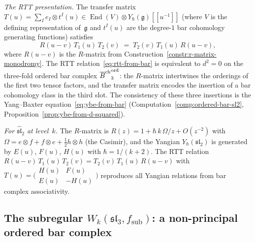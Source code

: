 \begin{construction}
\emph{The RTT presentation.}
The transfer matrix
$T(u)=\sum_I e_I\otimes t^I(u)
\in\operatorname{End}(V)\otimes Y_\hbar(\mathfrak g)[\![u^{-1}]\!]$
(where $V$ is the defining representation of~$\mathfrak g$
and $t^I(u)$ are the degree-$1$ bar cohomology generating
functions) satisfies
\begin{equation}%
R(u{-}v)\,T_1(u)\,T_2(v)
\;=\;
T_2(v)\,T_1(u)\,R(u{-}v),
\end{equation}
where $R(u-v)$ is the $R$-matrix from
Construction~\ref{constr:r-matrix-monodromy}. The RTT
relation~\eqref{eq:rtt-from-bar} is equivalent to $d^2=0$
on the three-fold ordered bar complex
${\overline{B}^{\mathrm{ch}}}_3^{\mathrm{ord}}$: the $R$-matrix intertwines the
orderings of the first two tensor factors, and the transfer
matrix encodes the insertion of a bar cohomology class in
the third slot. The consistency of these three insertions
is the Yang--Baxter
equation~\eqref{eq:ybe-from-bar}
(Computation~\ref{comp:ordered-bar-sl2},
Proposition~\ref{prop:ybe-from-d-squared}).

\emph{For $\widehat{\mathfrak{sl}}_2$ at level~$k$.}
The $R$-matrix is $R(z)=1+\hbar\,k\,\Omega/z+O(z^{-2})$ with
$\Omega=e\otimes f+f\otimes e+\tfrac12 h\otimes h$
(the Casimir), and the Yangian $Y_\hbar(\mathfrak{sl}_2)$
is generated by $E(u)$, $F(u)$, $H(u)$ with
$\hbar=1/(k+2)$. The RTT relation
$R(u{-}v)\,T_1(u)\,T_2(v)=T_2(v)\,T_1(u)\,R(u{-}v)$
with $T(u)=\bigl(\begin{smallmatrix}
H(u) & F(u) \\ E(u) & -H(u)
\end{smallmatrix}\bigr)$
reproduces all Yangian relations from bar complex
associativity.
\end{construction}

\subsection{The subregular $W_k(\mathfrak{sl}_3,f_{\mathrm{sub}})$:
a non-principal ordered bar complex}

